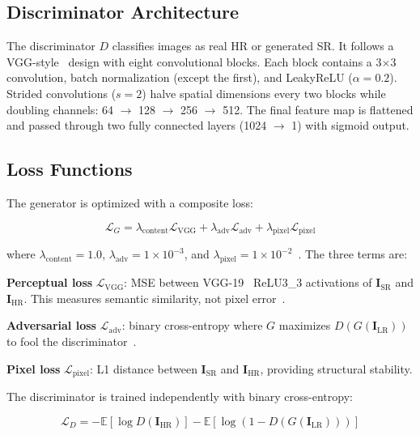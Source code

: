 \subsection{Discriminator Architecture}

The discriminator $D$ classifies images as real HR or generated SR.
It follows a VGG-style~\cite{simonyan2015} design with eight convolutional blocks.
Each block contains a 3$\times$3 convolution, batch normalization (except the first), and LeakyReLU ($\alpha=0.2$).
Strided convolutions ($s=2$) halve spatial dimensions every two blocks while doubling channels: 64 $\rightarrow$ 128 $\rightarrow$ 256 $\rightarrow$ 512.
The final feature map is flattened and passed through two fully connected layers (1024 $\rightarrow$ 1) with sigmoid output.

\subsection{Loss Functions}

The generator is optimized with a composite loss:

\begin{equation}
\mathcal{L}_G = \lambda_{\text{content}} \mathcal{L}_{\text{VGG}} + \lambda_{\text{adv}} \mathcal{L}_{\text{adv}} + \lambda_{\text{pixel}} \mathcal{L}_{\text{pixel}}
\label{eq:loss}
\end{equation}

where $\lambda_{\text{content}} = 1.0$, $\lambda_{\text{adv}} = 1 \times 10^{-3}$, and $\lambda_{\text{pixel}} = 1 \times 10^{-2}$~\cite{ledig2017}.
The three terms are:

\textbf{Perceptual loss} $\mathcal{L}_{\text{VGG}}$: MSE between VGG-19~\cite{simonyan2015} ReLU3\_3 activations of $\mathbf{I}_{\text{SR}}$ and $\mathbf{I}_{\text{HR}}$.
This measures semantic similarity, not pixel error~\cite{johnson2016}.

\textbf{Adversarial loss} $\mathcal{L}_{\text{adv}}$: binary cross-entropy where $G$ maximizes $D(G(\mathbf{I}_{\text{LR}}))$ to fool the discriminator~\cite{goodfellow2014}.

\textbf{Pixel loss} $\mathcal{L}_{\text{pixel}}$: L1 distance between $\mathbf{I}_{\text{SR}}$ and $\mathbf{I}_{\text{HR}}$, providing structural stability.

The discriminator is trained independently with binary cross-entropy:

\begin{equation}
\mathcal{L}_D = -\mathbb{E}\left[\log D(\mathbf{I}_{\text{HR}})\right] - \mathbb{E}\left[\log\left(1 - D(G(\mathbf{I}_{\text{LR}}))\right)\right]
\label{eq:disc_loss}
\end{equation}

